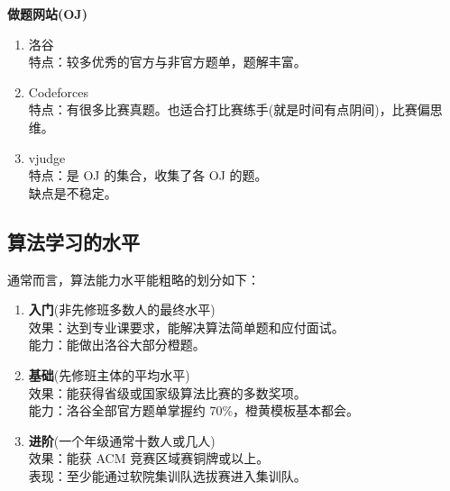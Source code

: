 \documentclass{beamer}
\begin{document}
\begin{frame}
    \large{\textbf{\color[RGB]{34, 164, 241}做题网站(OJ)}}\\
    \begin{enumerate}
        \item 洛谷\\
        特点：较多优秀的官方与非官方题单，题解丰富。
        \item Codeforces\\
        特点：有很多比赛真题。也适合打比赛练手(就是时间有点阴间)，比赛偏思维。
        \item vjudge\\
        特点：是 OJ 的集合，收集了各 OJ 的题。\\缺点是不稳定。
    \end{enumerate}
\end{frame}

\subsection{算法学习的水平}
\begin{frame}
    通常而言，算法能力水平能粗略的划分如下：
    \begin{enumerate}
        \item \textbf{入门}(非先修班多数人的最终水平)\\
        效果：达到专业课要求，能解决算法简单题和应付面试。\\
        能力：能做出洛谷大部分橙题。
        \item \textbf{基础}(先修班主体的平均水平)\\
        效果：能获得省级或国家级算法比赛的多数奖项。\\
        能力：洛谷全部官方题单掌握约 70\%，橙黄模板基本都会。
        \item \textbf{进阶}(一个年级通常十数人或几人)\\
        效果：能获 ACM 竞赛区域赛铜牌或以上。\\
        表现：至少能通过软院集训队选拔赛进入集训队。
    \end{enumerate}
\end{frame}
\end{document}
